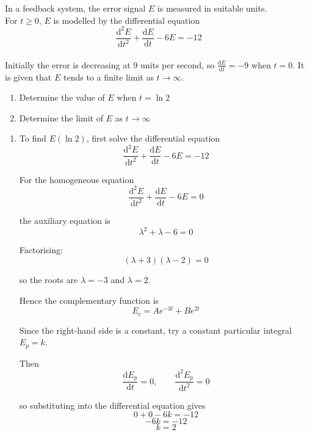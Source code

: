 \documentclass[leqno]{article}
\begin{document}
\begin{enumerate}[
  label=\textbf{\arabic*.},
  leftmargin=*,
  topsep=0pt,
  partopsep=0pt,
  parsep=0pt
]
\newpage

\questionitem

In a feedback system, the error signal $E$ is measured in suitable units. \\

For $t\ge 0$, $E$ is modelled by the differential equation
\[\frac{\mathrm{d}^2 E}{\mathrm{d} t^2}+\frac{\mathrm{d} E}{\mathrm{d} t}-6E=-12\] \\
Initially the error is decreasing at $9$ units per second, so $\frac{\mathrm{d} E}{\mathrm{d} t}=-9$ when $t=0$. It is given that $E$ tends to a finite limit as $t\to\infty$. \\

\begin{enumerate}[label=\textbf{(\alph*)}]
  \item Determine the value of $E$ when $t=\ln 2$  \\
  \item Determine the limit of $E$ as $t\to\infty$  \\
\end{enumerate}

\vspace*{10pt}

\begin{djsSolution}
\begin{enumerate}[label=\textbf{(\alph*)}]
  \item To find $E(\ln 2)$, first solve the differential equation
  \[
  \frac{\mathrm{d}^2E}{\mathrm{d}t^2}+\frac{\mathrm{d}E}{\mathrm{d}t}-6E=-12
  \]

  For the homogeneous equation
  \[
  \frac{\mathrm{d}^2E}{\mathrm{d}t^2}+\frac{\mathrm{d}E}{\mathrm{d}t}-6E=0
  \]

  the auxiliary equation is
  \[
  \lambda^2+\lambda-6=0
  \]

  Factorising:
  \[
  (\lambda+3)(\lambda-2)=0
  \]

  so the roots are $\lambda=-3$ and $\lambda=2$.

  Hence the complementary function is
  \[
  E_c=Ae^{-3t}+Be^{2t}
  \]

  Since the right-hand side is a constant, try a constant particular integral $E_p=k$.

  Then
  \[
  \frac{\mathrm{d}E_p}{\mathrm{d}t}=0, \qquad \frac{\mathrm{d}^2E_p}{\mathrm{d}t^2}=0
  \]

  so substituting into the differential equation gives
  \[
  0+0-6k=-12
  \]
  \[
  -6k=-12
  \]
  \[
  k=2
  \]


\end{enumerate}
\end{djsSolution}
\end{enumerate}
\end{document}
